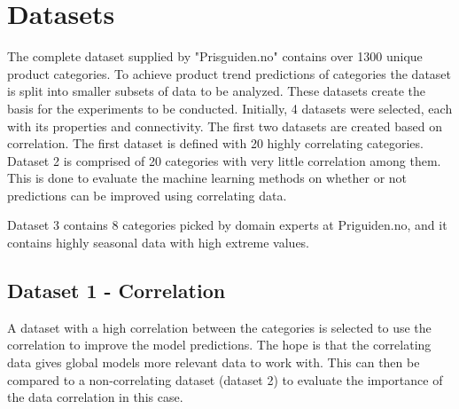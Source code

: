\section{Datasets}
\label{section:Data:Dataset}

The complete dataset supplied by "Prisguiden.no" contains over 1300 unique product categories.
To achieve product trend predictions of categories the dataset is split into smaller subsets of data to be analyzed.
These datasets create the basis for the experiments to be conducted.
Initially, 4 datasets were selected, each with its properties and connectivity.
The first two datasets are created based on correlation.
The first dataset is defined with 20 highly correlating categories.
Dataset 2 is comprised of 20 categories with very little correlation among them.
This is done to evaluate the machine learning methods on whether or not predictions can be improved using correlating data.

Dataset 3 contains 8 categories picked by domain experts at Priguiden.no, and it contains highly seasonal data with high extreme values.


\subsection{Dataset 1 - Correlation}

A dataset with a high correlation between the categories is selected to use the correlation to improve the model predictions.
The hope is that the correlating data gives global models more relevant data to work with.
This can then be compared to a non-correlating dataset (dataset 2) to evaluate the importance of the data correlation in this case.

